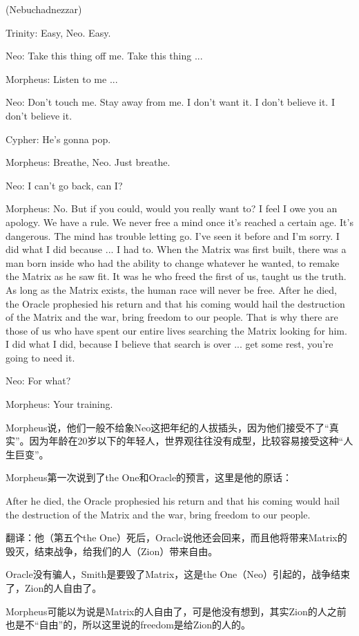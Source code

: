 \documentclass[UTF8]{ctexart}
\newenvironment{myquote}{\color{green} \setlength{\leftskip}{6em} \setlength{\rightskip}{4em} \setlength{\parindent}{-2em}}{\par}
\begin{document}
\begin{myquote}
(Nebuchadnezzar)

Trinity: Easy, Neo. Easy.

Neo: Take this thing off me. Take this thing ...

Morpheus: Listen to me ...

Neo: Don't touch me. Stay away from me. I don't want it. I don't believe it. I don't believe it.

Cypher: He's gonna pop.

Morpheus: Breathe, Neo. Just breathe.

Neo: I can't go back, can I?

Morpheus: No. But if you could, would you really want to? I feel I owe you an apology. We have a rule. We never free a mind once it's reached a certain age. It's dangerous. The mind has trouble letting go. I've seen it before and I'm sorry. I did what I did because ... I had to. When the Matrix was first built, there was a man born inside who had the ability to change whatever he wanted, to remake the Matrix as he saw fit. It was he who freed the first of us, taught us the truth. As long as the Matrix exists, the human race will never be free. After he died, the Oracle prophesied his return and that his coming would hail the destruction of the Matrix and the war, bring freedom to our people. That is why there are those of us who have spent our entire lives searching the Matrix looking for him. I did what I did, because I believe that search is over ... get some rest, you're going to need it.

Neo: For what?

Morpheus: Your training.
\end{myquote}

Morpheus说，他们一般不给象Neo这把年纪的人拔插头，因为他们接受不了“真实”。因为年龄在20岁以下的年轻人，世界观往往没有成型，比较容易接受这种“人生巨变”。

Morpheus第一次说到了the One和Oracle的预言，这里是他的原话：

After he died, the Oracle prophesied his return and that his coming would hail the destruction of the Matrix and the war, bring freedom to our people.

翻译：他（第五个the One）死后，Oracle说他还会回来，而且他将带来Matrix的毁灭，结束战争，给我们的人（Zion）带来自由。

Oracle没有骗人，Smith是要毁了Matrix，这是the One（Neo）引起的，战争结束了，Zion的人自由了。

Morpheus可能以为说是Matrix的人自由了，可是他没有想到，其实Zion的人之前也是不“自由”的，所以这里说的freedom是给Zion的人的。
\end{document}
